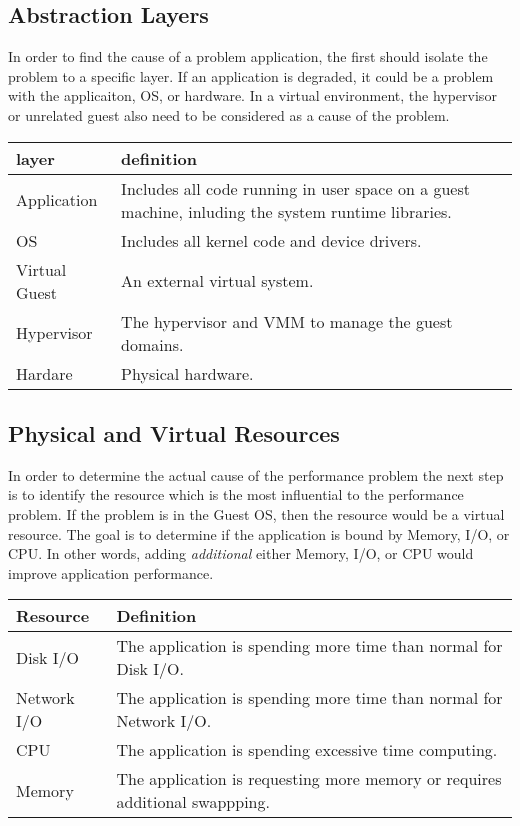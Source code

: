 \subsection{Abstraction Layers}
In order to find the cause of a problem application, the first should isolate the problem to a specific layer.  If an application is degraded, it could be a problem with the applicaiton, OS, or hardware.  In a virtual environment, the hypervisor or unrelated guest also need to be considered as a cause of the problem.  
\newline
\begin{tabular}{ l p{5cm} }
  layer & definition \\
  \hline
  Application & Includes all code running in user space on a guest machine, inluding the system runtime libraries. \\
  OS & Includes all kernel code and device drivers. \\
  Virtual Guest & An external virtual system. \\
  Hypervisor & The hypervisor and VMM to manage the guest domains. \\
  Hardare & Physical hardware. \\
\end{tabular}

\subsection{Physical and Virtual Resources}
In order to determine the actual cause of the performance problem the next step is to identify the resource which is the most influential to the performance problem.  If the problem is in the Guest OS, then the resource would be a virtual resource.  The goal is to determine if the application is bound by Memory, I/O, or CPU.  In other words, adding \emph{additional} either Memory, I/O, or CPU would improve application performance.  
\newline

\begin{tabular}{ l p{5cm} }
  Resource & Definition \\
  \hline
  Disk I/O & The application is spending more time than normal for Disk I/O. \\
  Network I/O & The application is spending more time than normal for Network I/O. \\
  CPU & The application is spending excessive time computing. \\
  Memory & The application is requesting more memory or requires additional swappping. \\
\end{tabular}

